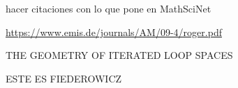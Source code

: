 \documentclass[TFM.tex]{subfiles}
\begin{document}
%


\begin{thebibliography}{}






 hacer citaciones con lo que pone en MathSciNet

 \url{https://www.emis.de/journals/AM/09-4/roger.pdf}





 THE GEOMETRY OF ITERATED LOOP SPACES

 ESTE ES FIEDEROWICZ







\end{thebibliography}
\end{document}
